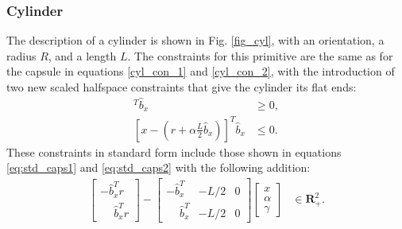 \subsubsection{Cylinder}
The description of a cylinder is shown in Fig. \ref{fig_cyl}, with an orientation, a radius $R$, and a length $L$. The constraints for this primitive are the same as for the capsule in equations \eqref{cyl_con_1} and \eqref{cyl_con_2}, with the introduction of two new scaled halfspace constraints that give the cylinder its flat ends:
\begin{align}
    [x - (r - \alpha \frac{L}{2} \hat{b}_x)]^T \hat{b}_x &\geq 0, \\ 
    [x - (r + \alpha \frac{L}{2} \hat{b}_x)]^T \hat{b}_x &\leq 0.
\end{align}
These constraints in standard form include those shown in equations \eqref{eq:std_caps1} and \eqref{eq:std_caps2} with the following addition:
\begin{align}
    \begin{bmatrix}  -\hat{b}_x^Tr \\ \phantom{-}\hat{b}_x^Tr \end{bmatrix} - \begin{bmatrix}  -\hat{b}_x^T & -L/2 & 0 \\ \phantom{-} \hat{b}_x^T & -L/2 & 0\end{bmatrix} \begin{bmatrix} x \\ \alpha \\ \gamma \end{bmatrix} &\in \mathbf{R}_+^2.
\end{align}

